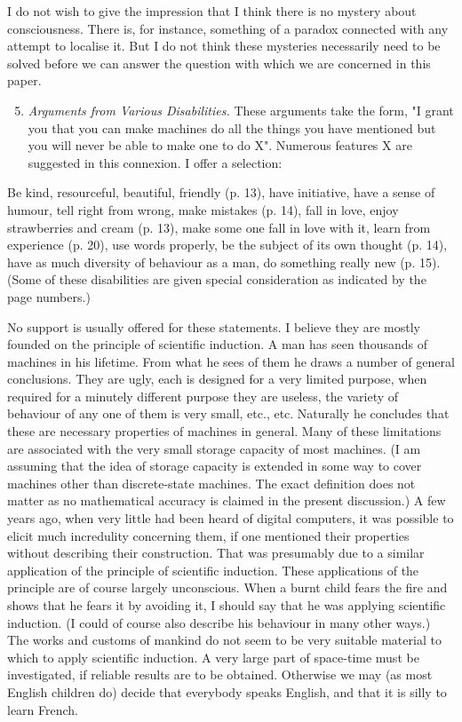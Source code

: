 \documentclass[12pt]{article}
\begin{document}
    I do not wish to give the impression that I think there is no mystery about consciousness. There is, for instance, something of a paradox connected with any attempt to localise it. But I do not think these mysteries necessarily need to be solved before we can answer the question with which we are concerned in this paper.
    
    \begin{enumerate}[label=(\arabic*)]
        \setcounter{enumi}{4}
        \item{\textit{Arguments from Various Disabilities.} These arguments take the form, "I grant you that you can make machines do all the things you have mentioned but you will never be able to make one to do X". Numerous features X are suggested in this connexion. I offer a selection:}
    \end{enumerate}

    Be kind, resourceful, beautiful, friendly (p. 13), have initiative, have a sense of humour, tell right from wrong, make mistakes (p. 14), fall in love, enjoy strawberries and cream (p. 13), make some one fall in love with it, learn from experience (p. 20), use words properly, be the subject of its own thought (p. 14), have as much diversity of behaviour as a man, do something really new (p. 15). (Some of these disabilities are given special consideration as indicated by the page numbers.)
    \vspace{\baselineskip}

    No support is usually offered for these statements. I believe they are mostly founded on the principle of scientific induction. A man has seen thousands of machines in his lifetime. From what he sees of them he draws a number of general conclusions. They are ugly, each is designed for a very limited purpose, when required for a minutely different purpose they are useless, the variety of behaviour of any one of them is very small, etc., etc. Naturally he concludes that these are necessary properties of machines in general. Many of these limitations are associated with the very small storage capacity of most machines. (I am assuming that the idea of storage capacity is extended in some way to cover machines other than discrete-state machines. The exact definition does not matter as no mathematical accuracy is claimed in the present discussion.) A few years ago, when very little had been heard of digital computers, it was possible to elicit much incredulity concerning them, if one mentioned their properties without describing their construction. That was presumably due to a similar application of the principle of scientific induction. These applications of the principle are of course largely unconscious. When a burnt child fears the fire and shows that he fears it by avoiding it, I should say that he was applying scientific induction. (I could of course also describe his behaviour in many other ways.) The works and customs of mankind do not seem to be very suitable material to which to apply scientific induction. A very large part of space-time must be investigated, if reliable results are to be obtained. Otherwise we may (as most English children do) decide that everybody speaks English, and that it is silly to learn French.
\end{document}
